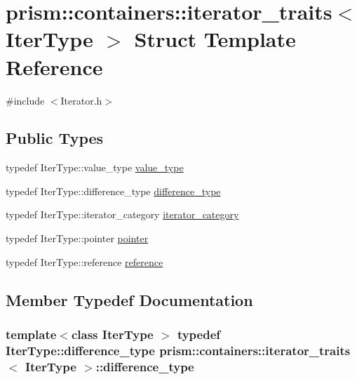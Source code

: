 \hypertarget{structprism_1_1containers_1_1iterator__traits}{}\section{prism\+:\+:containers\+:\+:iterator\+\_\+traits$<$ Iter\+Type $>$ Struct Template Reference}
\label{structprism_1_1containers_1_1iterator__traits}


{\ttfamily \#include $<$Iterator.\+h$>$}

\subsection*{Public Types}
\begin{DoxyCompactItemize}
\item 
typedef Iter\+Type\+::value\+\_\+type \hyperlink{structprism_1_1containers_1_1iterator__traits_a05456cbad2153f8d17c1095e38ddb476}{value\+\_\+type}
\item 
typedef Iter\+Type\+::difference\+\_\+type \hyperlink{structprism_1_1containers_1_1iterator__traits_a14cf6094269409269b901919b936af65}{difference\+\_\+type}
\item 
typedef Iter\+Type\+::iterator\+\_\+category \hyperlink{structprism_1_1containers_1_1iterator__traits_abfff3c9f89cb0bfaa226dddbd5c834ea}{iterator\+\_\+category}
\item 
typedef Iter\+Type\+::pointer \hyperlink{structprism_1_1containers_1_1iterator__traits_a1e0e2fe3c13aa8ce3059b58b4aa2bbc0}{pointer}
\item 
typedef Iter\+Type\+::reference \hyperlink{structprism_1_1containers_1_1iterator__traits_ad9d4fc80745a324d716f2fb95b8f5f80}{reference}
\end{DoxyCompactItemize}


\subsection{Member Typedef Documentation}
\subsubsection[{\texorpdfstring{difference\+\_\+type}{difference_type}}]{\setlength{\rightskip}{0pt plus 5cm}template$<$class Iter\+Type $>$ typedef Iter\+Type\+::difference\+\_\+type {\bf prism\+::containers\+::iterator\+\_\+traits}$<$ Iter\+Type $>$\+::{\bf difference\+\_\+type}}\hypertarget{structprism_1_1containers_1_1iterator__traits_a14cf6094269409269b901919b936af65}{}\label{structprism_1_1containers_1_1iterator__traits_a14cf6094269409269b901919b936af65}
